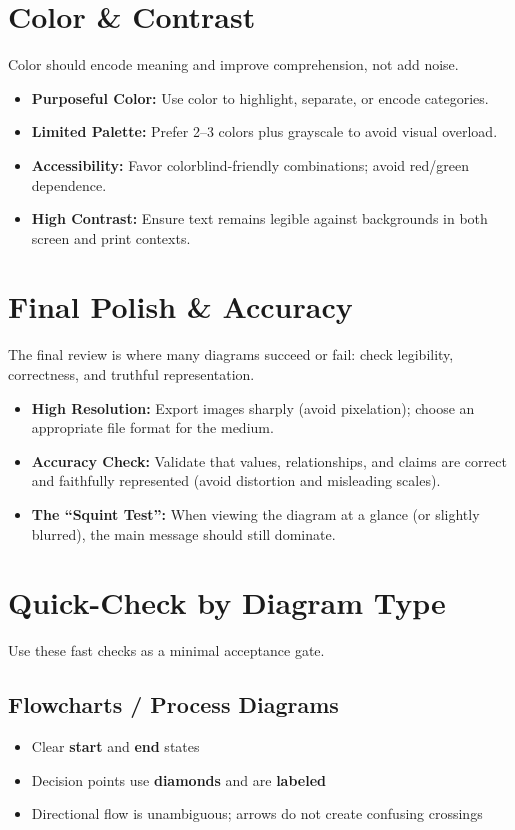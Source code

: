 \documentclass[11pt]{article}
\begin{document}
\section{Color \& Contrast}
Color should encode meaning and improve comprehension, not add noise.\cite{ref6,ref7,ref11}

\begin{itemize}
  \item \textbf{Purposeful Color:} Use color to highlight, separate, or encode categories.
  \item \textbf{Limited Palette:} Prefer 2--3 colors plus grayscale to avoid visual overload.
  \item \textbf{Accessibility:} Favor colorblind-friendly combinations; avoid red/green dependence.
  \item \textbf{High Contrast:} Ensure text remains legible against backgrounds in both screen and print contexts.\cite{ref6,ref7,ref8,ref11}
\end{itemize}

\section{Final Polish \& Accuracy}
The final review is where many diagrams succeed or fail: check legibility, correctness, and truthful representation.\cite{ref1,ref14}

\begin{itemize}
  \item \textbf{High Resolution:} Export images sharply (avoid pixelation); choose an appropriate file format for the medium.
  \item \textbf{Accuracy Check:} Validate that values, relationships, and claims are correct and faithfully represented (avoid distortion and misleading scales).
  \item \textbf{The “Squint Test”:} When viewing the diagram at a glance (or slightly blurred), the main message should still dominate.\cite{ref2,ref11,ref14,ref15}
\end{itemize}

\section{Quick-Check by Diagram Type}
Use these fast checks as a minimal acceptance gate.\cite{ref12,ref16,ref17}

\subsection{Flowcharts / Process Diagrams}
\begin{itemize}
  \item Clear \textbf{start} and \textbf{end} states
  \item Decision points use \textbf{diamonds} and are \textbf{labeled}
  \item Directional flow is unambiguous; arrows do not create confusing crossings
\end{itemize}
\end{document}
